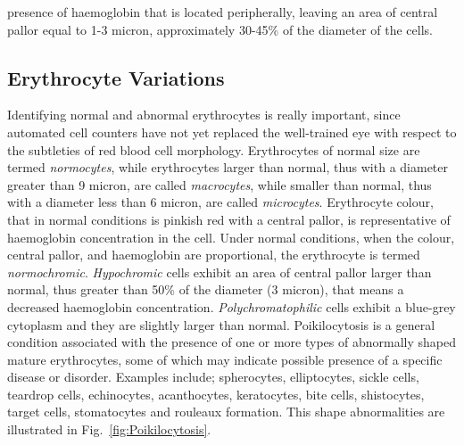 \documentclass[final,a4paper,12pt,english]{UnicaPhdThesis3}
\begin{document}
presence of haemoglobin that is located peripherally, leaving an area of central pallor equal to 1-3 micron, approximately 30-45\% of the diameter of the cells. 

\subsection{Erythrocyte Variations}
Identifying normal and abnormal erythrocytes is really important, since automated cell counters have not yet replaced the well-trained eye with respect to the subtleties of red blood cell morphology. Erythrocytes of normal size are termed \textit{normocytes}, while erythrocytes larger than normal, thus with a diameter greater than 9 micron, are called \textit{macrocytes}, while smaller than normal, thus with a diameter less than 6 micron, are called \textit{microcytes}. Erythrocyte colour, that in normal conditions is pinkish red with a central pallor, is representative of haemoglobin concentration in the cell. Under normal conditions, when the colour, central pallor, and haemoglobin are proportional, the erythrocyte is termed \textit{normochromic}. \textit{Hypochromic} cells exhibit an area of central pallor larger than normal, thus greater than 50\% of the diameter (3 micron), that means a decreased haemoglobin concentration. \textit{Polychromatophilic} cells exhibit a blue-grey cytoplasm and they are slightly larger than normal. Poikilocytosis is a general condition associated with the presence of one or more types of abnormally shaped mature erythrocytes, some of which may indicate possible presence of a specific disease or disorder. Examples include; spherocytes, elliptocytes, sickle cells, teardrop cells, echinocytes, acanthocytes, keratocytes, bite cells, shistocytes, target cells, stomatocytes and rouleaux formation. This shape abnormalities are illustrated in Fig.~\ref{fig:Poikilocytosis}.
\end{document}
